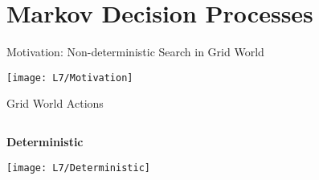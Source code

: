 \documentclass[11pt,aspectratio=169]{beamer}
\subtitle{\vspace{2.1em}Lecture 7: Stochastic Games}
\begin{document}
 \begin{frame}[plain]
  \titlepage
 \end{frame}
 
 
 \section{Markov Decision Processes}
 
  \begin{frame}{Motivation: Non-deterministic Search in Grid World}
   \begin{center}
    \texttt{[image: L7/Motivation]}
   \end{center}
  \end{frame}
  
  
  \begin{frame}{Grid World Actions}
   \begin{columns}
    \begin{column}{0.3\textwidth}
     \begin{center}
      \textbf{Deterministic}
     \end{center}
     \vspace{0.05cm}
     \begin{center}
      \texttt{[image: L7/Deterministic]}
     \end{center}
    \end{column}
    \begin{column}{0.7\textwidth}
    \end{column}
   \end{columns}
  \end{frame}
  
\end{document}
